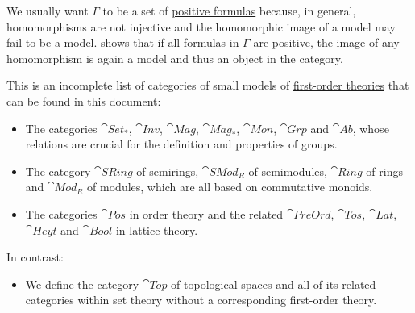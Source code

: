 \begin{remark}\label{rem:positive_formulas_in_category_of_models}
  We usually want \( \Gamma \) to be a set of \hyperref[def:positive_formula]{positive formulas} because, in general, homomorphisms are not injective and the homomorphic image of a model may fail to be a model.  shows that if all formulas in \( \Gamma \) are positive, the image of any homomorphism is again a model and thus an object in the category.
\end{remark}

\begin{example}\label{ex:def:category_of_small_first_order_models}
  This is an incomplete list of categories of small models of \hyperref[def:first_order_theory]{first-order theories} that can be found in this document:
  \begin{itemize}
    \item The categories \hyperref[def:pointed_set/category]{\( \cat{Set_*} \)}, \hyperref[def:set_with_involution/category]{\( \cat{Inv} \)}, \hyperref[def:magma/category]{\( \cat{Mag} \)}, \hyperref[def:monoid/category]{\( \cat{Mag}_* \)}, \hyperref[def:monoid]{\( \cat{Mon} \)}, \hyperref[def:group/category]{\( \cat{Grp} \)} and \hyperref[def:abelian_group]{\( \cat{Ab} \)}, whose relations are crucial for the definition and properties of groups.

    \item The category \hyperref[def:semiring/category]{\( \cat{SRing} \)} of semirings, \hyperref[def:semimodule]{\( \cat{SMod}_R \)} of semimodules, \hyperref[def:ring/category]{\( \cat{Ring} \)} of rings and \hyperref[def:module/category]{\( \cat{Mod}_R \)} of modules, which are all based on commutative monoids.

    \item The categories \hyperref[def:partially_ordered_set/category]{\( \cat{Pos} \)} in order theory and the related \hyperref[def:preordered_set/category]{\( \cat{PreOrd} \)}, \hyperref[def:totally_ordered_set/category]{\( \cat{Tos} \)}, \hyperref[def:semilattice/category]{\( \cat{Lat} \)}, \hyperref[def:heyting_algebra/category]{\( \cat{Heyt} \)} and \hyperref[def:boolean_algebra/category]{\( \cat{Bool} \)} in lattice theory.
  \end{itemize}

  In contrast:
  \begin{itemize}
    \item We define the category \hyperref[def:category_of_small_topological_spaces]{\( \cat{Top} \)}  of topological spaces and all of its related categories within set theory without a corresponding first-order theory.


\end{itemize}
\end{example}
